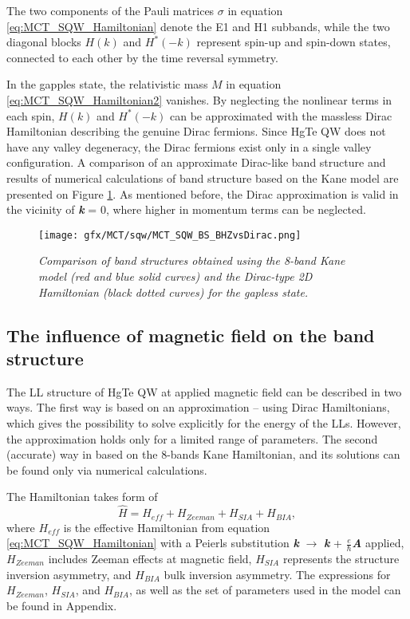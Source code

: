 \documentclass[titlepage,a4paper]{book}
\newcommand{\wciecie}{\quad\phantom{v}}
\begin{document}
The two components of the Pauli matrices $\sigma$ in equation \ref{eq:MCT_SQW_Hamiltonian} denote the E1 and H1 subbands, while the two diagonal blocks $H(k)$ and $H^*(-k)$ represent spin-up and spin-down states, connected to each other by the time reversal symmetry. 

In the gapples state, the relativistic mass $M$ in equation \ref{eq:MCT_SQW_Hamiltonian2} vanishes. By neglecting the nonlinear terms in each spin, $H(k)$ and $H^*(-k)$ can be approximated with the massless Dirac Hamiltonian describing the genuine Dirac fermions. Since HgTe QW does not have any valley degeneracy, the Dirac fermions exist only in a single valley configuration. A comparison of an approximate Dirac-like band structure and results of numerical calculations of band structure based on the Kane model are presented on Figure \ref{fig:MCT_SQW_BS_BHZvsDirac}. As mentioned before, the Dirac approximation is valid in the vicinity of \textbf{\textit{k}} = 0, where higher in momentum terms can be neglected.  

\begin{figure}[H]
	\centering
	\texttt{[image: gfx/MCT/sqw/MCT\_SQW\_BS\_BHZvsDirac.png]}
	\vspace{-10pt}
	\caption{\textit{Comparison of band structures obtained using the 8-band Kane model (red and blue solid curves) and the Dirac-type 2D Hamiltonian (black dotted curves) for the gapless state.}}
	\label{fig:MCT_SQW_BS_BHZvsDirac}
\end{figure} 

\subsection{The influence of magnetic field on the band structure}
\wciecie
The LL structure of HgTe QW at applied magnetic field can be described in two ways. The first way is based on an approximation -- using Dirac Hamiltonians, which gives the possibility to solve explicitly for the energy of the LLs. However, the approximation holds only for a limited range of parameters. The second (accurate) way in based on the 8-bands Kane Hamiltonian, and its solutions can be found only via numerical calculations.

The Hamiltonian takes form of
\begin{equation}
\label{eq:MCT_SQW_MagneticField}
\hat H = H_{eff} + H_{Zeeman} + H_{SIA} + H_{BIA} ,
\end{equation}
where $H_{eff}$ is the effective Hamiltonian from equation \ref{eq:MCT_SQW_Hamiltonian} with a Peierls substitution \textbf{\textit{k}} $\rightarrow$ \textbf{\textit{k}} + $\frac{e}{\hbar}$\textbf{\textit{A}} applied, $H_{Zeeman}$ includes Zeeman effects at magnetic field, $H_{SIA}$
represents the structure inversion asymmetry, and $H_{BIA}$ bulk inversion asymmetry. The expressions for $H_{Zeeman}$, $H_{SIA}$, and $H_{BIA}$, as well as the set of parameters used in the model can be found in Appendix.
\end{document}
